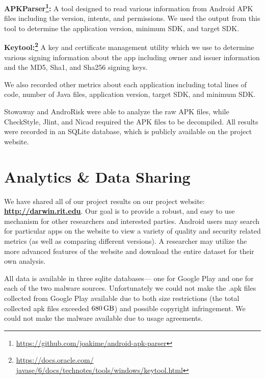\documentclass{sig-alternate-05-2015}
\begin{document}

 \textbf{APKParser\footnote{\url{https://github.com/joakime/android-apk-parser}}:} A tool designed to read various information from Android APK files including the version, intents, and permissions. We used the output from this tool to determine the application version, minimum SDK, and target SDK.


 \textbf{Keytool:\footnote{\url{https://docs.oracle.com/ javase/6/docs/technotes/tools/windows/keytool.html}}} A key and certificate management utility which we use to determine various signing information about the app including owner and issuer information and the MD5, Sha1, and Sha256 signing keys.



We also recorded other metrics about each application including total lines of code, number of Java files, application version, target SDK, and minimum SDK.


Stowaway and AndroRisk were able to analyze the raw APK files, while CheckStyle, Jlint, and Nicad required the APK files to be decompiled. All results were recorded in an SQLite database, which is publicly available on the project website.



\section{Analytics \& Data Sharing}
\label{sec: Website}

We have shared all of our project results on our project website: \textbf{\url{http://darwin.rit.edu}}. Our goal is to provide a robust, and easy to use mechanism for other researchers and interested parties. Android users may search for particular apps on the website to view a variety of quality and security related metrics (as well as comparing different versions). A researcher may utilize the more advanced features of the website and download the entire dataset for their own analysis.

All data is available in three sqlite databases--- one for Google Play and one for each of the two malware sources. Unfortunately we could not make the .apk files collected from Google Play available due to both size restrictions (the total collected apk files exceeded $\SI{680}{\giga\byte}$) and possible copyright infringement. We could not make the malware available due to usage agreements.
\end{document}
